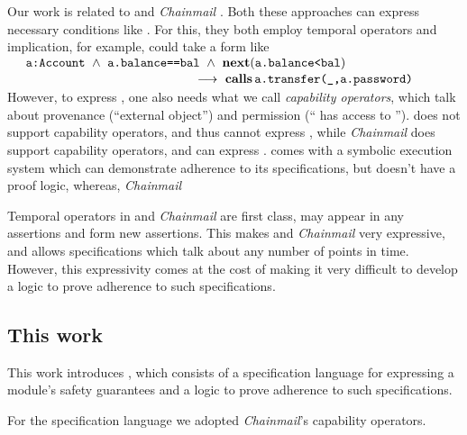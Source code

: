 {Our work is related} to  {} \cite{VerX} and  \emph{Chainmail} \cite{FASE}.
Both these approaches can express necessary conditions
  like \SrobustA. For this, they  {both employ
  temporal operators and implication, for example,  \SrobustA
 could take a form like} 
\\
 $\strut ~  ~ \hspace{.1in} \strut  \prg{a:Account} \ \wedge\ \prg{a.balance==bal}  \ \wedge\ \textbf{next}(\prg{a.balance<bal}) $\\
 $\strut ~ \hspace{2in} \strut \strut \strut \longrightarrow\    \textbf{calls}\, {\texttt{a.transfer(\_,a.password)}}$
 \\
 { However, to express \SrobustB, one also needs what we call \emph{capability operators}, which talk about 
 provenance (``external object'') and
  permission (`` has access to ''). 
   {}  does not support capability operators, and thus cannot express   \SrobustB, 
   while  \emph{Chainmail} does support capability operators, and can express  \SrobustB. 
}  
 {} comes with a symbolic 
  execution system which can demonstrate adherence to its specifications, but doesn't have a proof logic, %
   whereas, \emph{Chainmail}  
  
 {Temporal operators in {}   and  \emph{Chainmail}  are first class, \ie may appear in any assertions 
and form new assertions. This makes {}   and  \emph{Chainmail} very expressive,
and allows specifications which talk about any number of points in time.
However, this expressivity comes at the cost of making it very difficult to develop a logic to
prove adherence to such specifications.}
  
\vspace{.04in}

\subsection{This work}
\label{intro:this:work}
This work introduces \Nec, which consists of a specification language for expressing a module's safety guarantees 
and a logic 
to prove adherence to such specifications.

For the specification language we adopted %
\emph{Chainmail}'s %
  capability operators.
  
